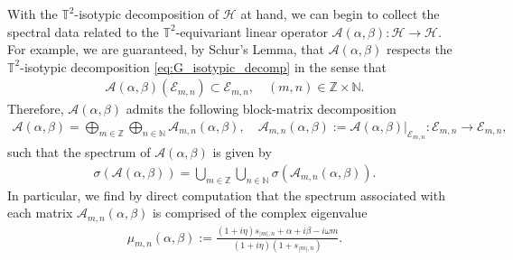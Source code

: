 \documentclass[11pt]{amsart}
\def\bn{{\mathbb{N}}}
\def\bz{{\mathbb{Z}}}
\def\bt{{\mathbb{T}}}
\begin{document}
With the $\bt^2$-isotypic decomposition of $\mathscr H$ at hand, we can begin to collect the spectral data related to the $\bt^2$-equivariant linear operator $\mathscr A(\alpha, \beta): \mathscr H \rightarrow \mathscr H$. For example, we are guaranteed, by Schur's Lemma, that $\mathscr A(\alpha,\beta)$ respects the $\bt^2$-isotypic decomposition \eqref{eq:G_isotypic_decomp} in the sense that
\begin{align*}
    \mathscr A(\alpha,\beta)(\mathscr E_{m,n}) \subset \mathscr E_{m,n}, \quad (m,n) \in \bz \times \bn.
\end{align*}
Therefore, $\mathscr A(\alpha,\beta)$ admits the following block-matrix decomposition
\begin{align*} %
\mathscr A(\alpha,\beta) =  
\bigoplus_{m \in \bz} \bigoplus_{n \in \bn  } \mathscr A_{m,n}(\alpha,\beta), \quad \mathscr A_{m,n}(\alpha,\beta) := \mathscr A(\alpha,\beta)|_{\mathscr E_{m,n}}: \mathscr E_{m,n} \rightarrow \mathscr E_{m,n},
\end{align*}
such that the spectrum of $\mathscr A(\alpha,\beta)$ is given by
\begin{align*}
    \sigma(\mathscr A(\alpha,\beta)) = \bigcup_{m \in \bz} \bigcup_{n\in \bn} \sigma(\mathscr A_{m,n}(\alpha,\beta)).
\end{align*}
In particular, we find by direct computation that the spectrum associated with each matrix
$\mathscr A_{m,n}(\alpha,\beta)$ is comprised of the complex eigenvalue
\begin{align} 
\label{def:eigenvalues_Anm}
\mu_{m,n}(\alpha,\beta) := \frac{(1+i\eta)s_{|m|,n} + \alpha +i \beta - i \omega m}{(1+i\eta)(1+s_{|m|,n})}.
\end{align}
\end{document}
